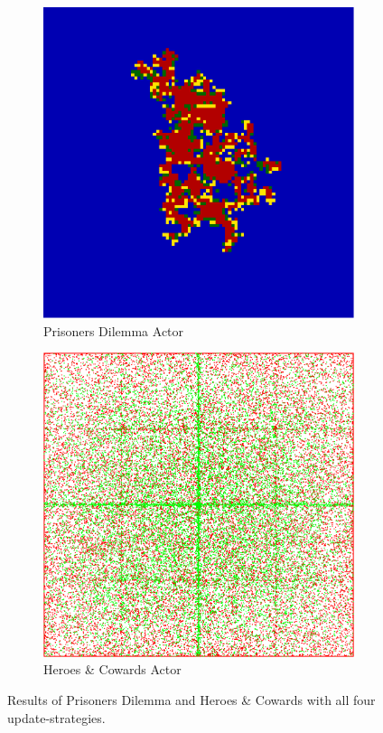\begin{figure}
    \begin{subfigure}[b]{0.4\textwidth}
		\centering
       	\includegraphics[width=.7\textwidth, angle=0]{./fig/act_99x99_436steps_MSG_haskell.png}
        \caption{Prisoners Dilemma Actor}
        \label{fig:pd_act}
    \end{subfigure}  
    \begin{subfigure}[b]{0.4\textwidth}
    	\centering
        \includegraphics[width=.7\textwidth, angle=0]{./fig/act_HAC_100_000_500steps_scala.png}
        \caption{Heroes \& Cowards Actor}
        \label{fig:hac_act}
    \end{subfigure}
        
	\caption{\small Results of Prisoners Dilemma and Heroes \& Cowards with all four update-strategies.} 
	\label{fig:results}
\end{figure}
    
